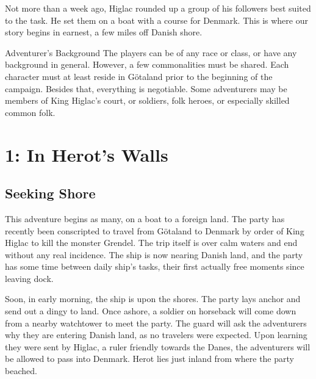 \documentclass[10pt,twoside,twocolumn,openany]{book}
\begin{document}
Not more than a week ago, Higlac rounded up a group of his followers best suited to the task. He set them on a boat with a course for Denmark. This is where our story begins in earnest, a few miles off Danish shore.

\begin{commentbox}{Adventurer's Background}
The players can be of any race or class, or have any background in general. However, a few commonalities must be shared. Each character must at least reside in G{\"o}taland prior to the beginning of the campaign. Besides that, everything is negotiable. Some adventurers may be members of King Higlac's court, or soldiers, folk heroes, or especially skilled common folk.
\end{commentbox}

\clearpage

\chapter{1: In Herot's Walls}

\section{Seeking Shore}
This adventure begins as many, on a boat to a foreign land. The party has recently been conscripted to travel from G{\"o}taland to Denmark by order of King Higlac to kill the monster Grendel. The trip itself is over calm waters and end without any real incidence. The ship is now nearing Danish land, and the party has some time between daily ship's tasks, their first actually free moments since leaving dock.

Soon, in early morning, the ship is upon the shores. The party lays anchor and send out a dingy to land. Once ashore, a soldier on horseback will come down from a nearby watchtower to meet the party. The guard will ask the adventurers why they are entering Danish land, as no travelers were expected. Upon learning they were sent by Higlac, a ruler friendly towards the Danes, the adventurers will be allowed to pass into Denmark. Herot lies just inland from where the party beached.
\end{document}
